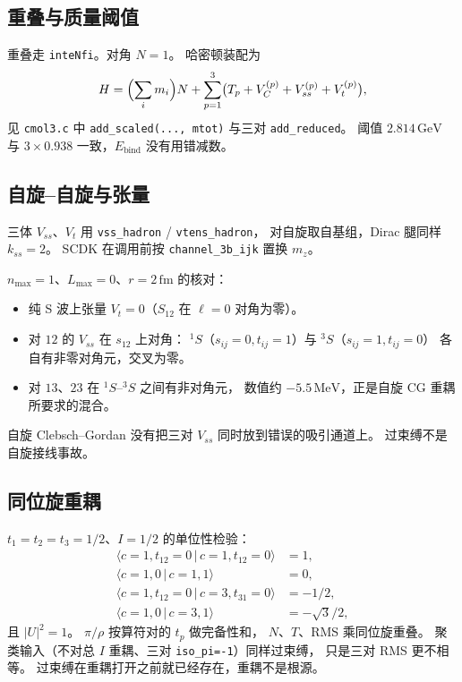 \documentclass[12pt,a4paper]{article}
\newcommand{\GeV}{\,\mathrm{GeV}}
\newcommand{\MeV}{\,\mathrm{MeV}}
\newcommand{\fm}{\,\mathrm{fm}}
\begin{document}
\subsection{重叠与质量阈值}

重叠走 \texttt{inteNfi}。对角 $N=1$。
哈密顿装配为
\begin{equation}
  H = \Bigl(\sum_i m_i\Bigr) N
  +\sum_{p=1}^{3}\bigl(T_p+V_C^{(p)}+V_{ss}^{(p)}+V_t^{(p)}\bigr),
\end{equation}
见 \texttt{cmol3.c} 中 \texttt{add\_scaled(..., mtot)} 与三对
\texttt{add\_reduced}。
阈值 $2.814\GeV$ 与 $3\times 0.938$ 一致，$E_{\mathrm{bind}}$ 没有用错减数。

\subsection{自旋--自旋与张量}

三体 $V_{ss}$、$V_t$ 用 \texttt{vss\_hadron} / \texttt{vtens\_hadron}，
对自旋取自基组，Dirac 腿同样 $k_{ss}=2$。
SCDK 在调用前按 \texttt{channel\_3b\_ijk} 置换 $m_z$。

$n_{\max}=1$、$L_{\max}=0$、$r=2\fm$ 的核对：
\begin{itemize}
  \item 纯 S 波上张量 $V_t=0$（$S_{12}$ 在 $\ell=0$ 对角为零）。
  \item 对 $12$ 的 $V_{ss}$ 在 $s_{12}$ 上对角：
        ${}^1S$（$s_{ij}=0,t_{ij}=1$）与 ${}^3S$（$s_{ij}=1,t_{ij}=0$）
        各自有非零对角元，交叉为零。
  \item 对 $13$、$23$ 在 ${}^1S$--${}^3S$ 之间有非对角元，
        数值约 $-5.5\MeV$，正是自旋 CG 重耦所要求的混合。
\end{itemize}
自旋 Clebsch--Gordan 没有把三对 $V_{ss}$ 同时放到错误的吸引通道上。
过束缚不是自旋接线事故。

\subsection{同位旋重耦}

$t_1=t_2=t_3=1/2$、$I=1/2$ 的单位性检验：
\begin{equation}
\begin{aligned}
  \langle c=1,t_{12}=0\,|\,c=1,t_{12}=0\rangle &= 1,\\
  \langle c=1,0\,|\,c=1,1\rangle &= 0,\\
  \langle c=1,t_{12}=0\,|\,c=3,t_{31}=0\rangle &= -1/2,\\
  \langle c=1,0\,|\,c=3,1\rangle &= -\sqrt{3}/2,
\end{aligned}
\end{equation}
且 $|U|^2=1$。
$\pi/\rho$ 按算符对的 $t_p$ 做完备性和，
$N$、$T$、RMS 乘同位旋重叠。
聚类输入（不对总 $I$ 重耦、三对 \texttt{iso\_pi=-1}）同样过束缚，
只是三对 RMS 更不相等。
过束缚在重耦打开之前就已经存在，重耦不是根源。
\end{document}
